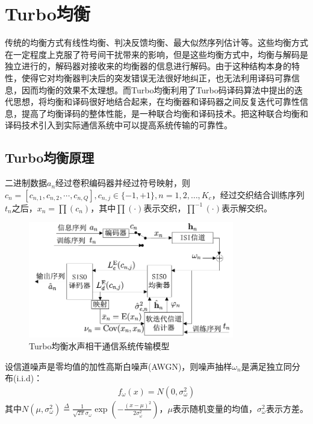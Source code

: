 \section{Turbo均衡}
传统的均衡方式有线性均衡、判决反馈均衡、最大似然序列估计等。这些均衡方式在一定程度上克服了符号间干扰带来的影响，但是这些均衡方式中，均衡与解码是独立进行的，解码器对接收来的均衡器的信息进行解码。由于这种结构本身的特性，使得它对均衡器判决后的突发错误无法很好地纠正，也无法利用译码可靠信息，因而均衡的效果不太理想。而Turbo均衡利用了Turbo码译码算法中提出的迭代思想，将均衡和译码很好地结合起来，在均衡器和译码器之间反复迭代可靠性信息，提高了均衡译码的整体性能，是一种联合均衡和译码技术。把这种联合均衡和译码技术引入到实际通信系统中可以提高系统传输的可靠性。
\subsection{Turbo均衡原理}
二进制数据$a_n$经过卷积编码器并经过符号映射，则$c_n=[c_{n,1},c_{n,2},\cdots,c_{n,Q}],c_{n,j}\in\{-1,+1\},n=1,2,\ldots,K_c$，经过交织结合训练序列$t_n$之后，$x_n=\prod(c_n)$，其中$\prod(\cdot)$表示交织，$\prod^{-1}(\cdot)$表示解交织。

\begin{figure}[htb]
  \begin{center}
    \includegraphics[width=0.8\textwidth]{images/totalcomm2.pdf}
  \end{center}
  \caption{Turbo均衡水声相干通信系统传输模型}
  \label{fig:2.4}
\end{figure}

设信道噪声是零均值的加性高斯白噪声(AWGN)，则噪声抽样$\omega_n$是满足独立同分布(i.i.d)：
\begin{eqnarray}
    f_{\omega}(x)=N(0,\sigma_{\omega}^2)
    \label{equ:2.32}
\end{eqnarray}
其中$N(\mu,\sigma_{\omega}^2)\overset{\Delta}{=}\frac{1}{\sqrt{2\pi}\sigma_{\omega}}\exp\left(-\frac{(x-\mu)^2}{2\sigma_{\omega}^2}\right)$，$\mu$表示随机变量的均值，$\sigma_{\omega}^2$表示方差。

